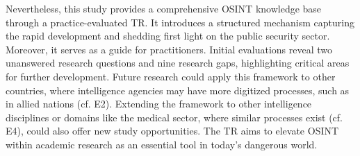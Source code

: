 \documentclass[10pt]{article}
\begin{document}
Nevertheless, this study provides a comprehensive OSINT knowledge base through a practice-evaluated TR. It introduces a structured mechanism capturing the rapid development and shedding first light on the public security sector. Moreover, it serves as a guide for practitioners. Initial evaluations reveal two unanswered research questions and nine research gaps, highlighting critical areas for further development. Future research could apply this framework to other countries, where intelligence agencies may have more digitized processes, such as in allied nations (cf. E2). Extending the framework to other intelligence disciplines or domains like the medical sector, where similar processes exist (cf. E4), could also offer new study opportunities. The TR aims to elevate OSINT within academic research as an essential tool in today’s dangerous world.

\end{document}

